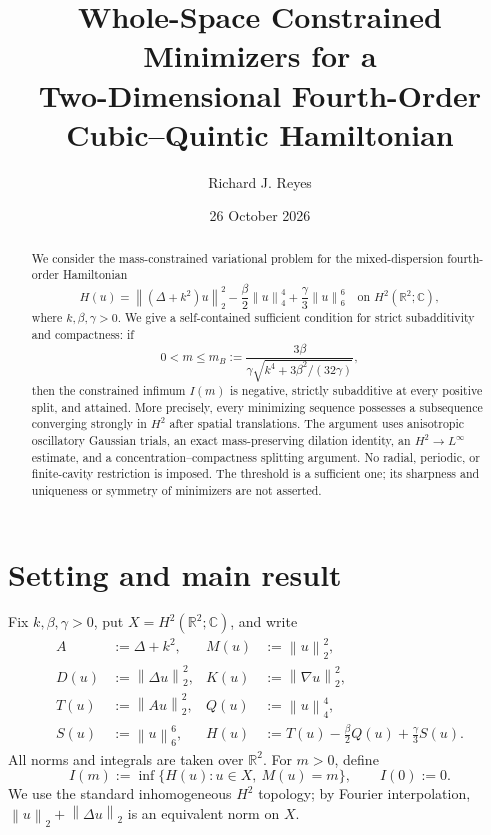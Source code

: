 \documentclass[11pt]{article}
\title{Whole-Space Constrained Minimizers for a\\
Two-Dimensional Fourth-Order Cubic--Quintic Hamiltonian}
\author{Richard J. Reyes}
\date{26 October 2026}
\numberwithin{equation}{section}
\theoremstyle{remark}
\newcommand{\R}{\mathbb{R}}
\newcommand{\C}{\mathbb{C}}
\newcommand{\norm}[1]{\left\lVert #1\right\rVert}
\newcommand{\Hs}{H^2(\R^2;\C)}
\begin{document}
\maketitle

\begin{abstract}
We consider the mass-constrained variational problem for the mixed-dispersion
fourth-order Hamiltonian
\[
H(u)=\norm{(\Delta+k^2)u}_{2}^{2}
-\frac{\beta}{2}\norm{u}_{4}^{4}
+\frac{\gamma}{3}\norm{u}_{6}^{6}
\quad\text{on }H^2(\R^2;\C),
\]
where $k,\beta,\gamma>0$.  We give a self-contained sufficient condition
for strict subadditivity and compactness: if
\[
0<m\le m_B:=\frac{3\beta}
{\gamma\sqrt{k^4+3\beta^2/(32\gamma)}},
\]
then the constrained infimum $I(m)$ is negative, strictly subadditive at every
positive split, and attained.  More precisely, every minimizing sequence
possesses a subsequence converging strongly in $H^2$ after spatial
translations.  The argument uses anisotropic oscillatory Gaussian trials,
an exact mass-preserving dilation identity, an $H^2\!\to L^\infty$
estimate, and a concentration--compactness splitting argument.  No radial,
periodic, or finite-cavity restriction is imposed.  The threshold is a
sufficient one; its sharpness and uniqueness or symmetry of minimizers are
not asserted.
\end{abstract}

\section{Setting and main result}

Fix $k,\beta,\gamma>0$, put $X=\Hs$, and write
\begin{align}
A&:=\Delta+k^2, & M(u)&:=\norm{u}_2^2,\\
D(u)&:=\norm{\Delta u}_2^2, & K(u)&:=\norm{\nabla u}_2^2,\\
T(u)&:=\norm{Au}_2^2, & Q(u)&:=\norm{u}_4^4,\\
S(u)&:=\norm{u}_6^6, &
H(u)&:=T(u)-\frac{\beta}{2}Q(u)+\frac{\gamma}{3}S(u).
\end{align}
All norms and integrals are taken over $\R^2$.  For $m>0$, define
\begin{equation}\label{eq:infimum}
I(m):=\inf\{H(u):u\in X,\ M(u)=m\},\qquad I(0):=0.
\end{equation}
We use the standard inhomogeneous $H^2$ topology; by Fourier interpolation,
$\norm{u}_2+\norm{\Delta u}_2$ is an equivalent norm on $X$.
\end{document}
